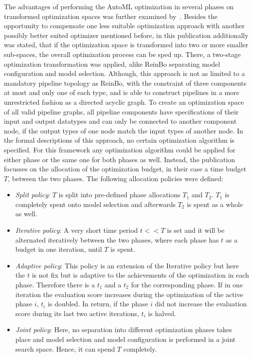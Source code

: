 The advantages of performing the AutoML optimization in several phases on transformed optimization spaces was further examined by~\textcite{Quemy-Two-Stage-Optimization}.
Besides the opportunity to compensate one less suitable optimization approach with another possibly better suited optimizer mentioned before, in this publication additionally was stated, that if the optimization space is transformed into two or more smaller sub-spaces, the overall optimization process can be sped up.
There, a two-stage optimization transformation was applied, alike ReinBo separating model configuration and model selection.
Although, this approach is not as limited to a mandatory pipeline topology as ReinBo, with the constraint of three components at most and only one of each type, and is able to construct pipelines in a more unrestricted fashion as a directed acyclic graph.
To create an optimization space of all valid pipeline graphs, all pipeline components have specifications of their input and output datatypes and can only be connected to another component node, if the output types of one node match the input types of another node.\newline
In the formal descriptions of this approach, no certain optimization algorithm is specified.
For this framework any optimization algorithm could be applied for either phase or the same one for both phases as well.
Instead, the publication focusses on the allocation of the optimization budget, in their case a time budget $T$, between the two phases.
The following allocation policies were defined:
\begin{itemize}
    \item \textit{Split policy}: $T$ is split into pre-defined phase allocations $T_1$ and $T_2$. $T_1$ is completely spent onto model selection and afterwards $T_2$ is spent as a whole as well.
    \item \textit{Iterative policy}: A very short time period $t << T$ is set and it will be alternated iteratively between the two phases, where each phase has $t$ as a budget in one iteration, until $T$ is spent.
    \item \textit{Adaptive policy}: This policy is an extension of the Iterative policy but here the $t$ is not fix but is adaptive to the achievements of the optimization in each phase.
    Therefore there is a $t_1$ and a $t_2$ for the corresponding phase.
    If in one iteration the evaluation score increases during the optimization of the active phase $i$, $t_i$ is doubled.
    In return, if the phase $i$ did not increase the evaluation score during its last two active iterations, $t_i$ is halved.
    \item \textit{Joint policy}: Here, no separation into different optimization phases takes place and model selection and model configuration is performed in a joint search space.
    Hence, it can spend $T$ completely.
\end{itemize}


